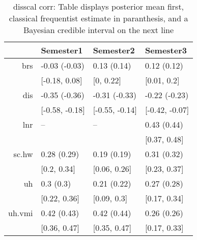 \begin{table}[ht]
\centering
\begin{tabular}{rlll}
  \hline
 & Semester1 & Semester2 & Semester3 \\ 
  \hline
brs & -0.03 (-0.03) & 0.13 (0.14) & 0.12 (0.12) \\ 
   & [-0.18, 0.08] & [0, 0.22] & [0.01, 0.2] \\ 
  dis & -0.35 (-0.36) & -0.31 (-0.33) & -0.22 (-0.23) \\ 
     & [-0.58, -0.18] & [-0.55, -0.14] & [-0.42, -0.07] \\ 
  lnr & -- & -- & 0.43 (0.44) \\ 
       &  &  & [0.37, 0.48] \\ 
  sc.hw & 0.28 (0.29) & 0.19 (0.19) & 0.31 (0.32) \\ 
         & [0.2, 0.34] & [0.06, 0.26] & [0.23, 0.37] \\ 
  uh & 0.3 (0.3) & 0.21 (0.22) & 0.27 (0.28) \\ 
           & [0.22, 0.36] & [0.09, 0.3] & [0.17, 0.34] \\ 
  uh.vmi & 0.42 (0.43) & 0.42 (0.44) & 0.26 (0.26) \\ 
             & [0.36, 0.47] & [0.35, 0.47] & [0.17, 0.33] \\ 
   \hline
\end{tabular}
\caption{disscal corr: Table displays posterior mean first, classical frequentist estimate in paranthesis, and a Bayesian credible interval on the next line} 
\label{disscal_corr}
\end{table}
